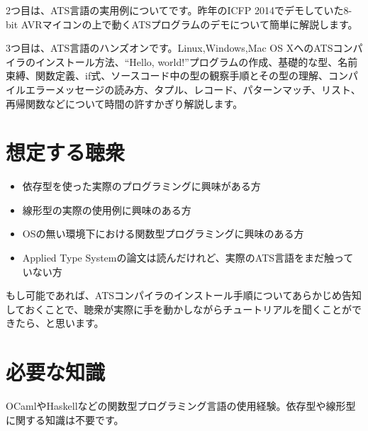 \documentclass[japanese]{jssst_ppl} %
\begin{document}
2つ目は、ATS言語の実用例についてです。昨年のICFP 2014でデモしていた8-bit AVRマイコン\cite{arduino-uno}の上で動くATSプログラムのデモ\cite{arduino-ats}について簡単に解説\cite{20141019-osc-tokyoats}します。

3つ目は、ATS言語のハンズオンです。Linux,Windows,Mac OS XへのATSコンパイラのインストール方法、``Hello, world!''プログラムの作成、基礎的な型、名前束縛、関数定義、if式、ソースコード中の型の観察手順とその型の理解、コンパイルエラーメッセージの読み方、タプル、レコード、パターンマッチ、リスト、再帰関数などについて時間の許すかぎり解説します。

\section{想定する聴衆}

\begin{itemize}
\item 依存型を使った実際のプログラミングに興味がある方
\item 線形型の実際の使用例に興味のある方
\item OSの無い環境下における関数型プログラミングに興味のある方
\item Applied Type Systemの論文\cite{ATStypes03}\cite{ATStypes03-J}は読んだけれど、実際のATS言語をまだ触っていない方
\end{itemize}

もし可能であれば、ATSコンパイラのインストール手順についてあらかじめ告知しておくことで、聴衆が実際に手を動かしながらチュートリアルを聞くことができたら、と思います。

\section{必要な知識}

OCamlやHaskellなどの関数型プログラミング言語の使用経験。依存型や線形型に関する知識は不要です。



\end{document}
